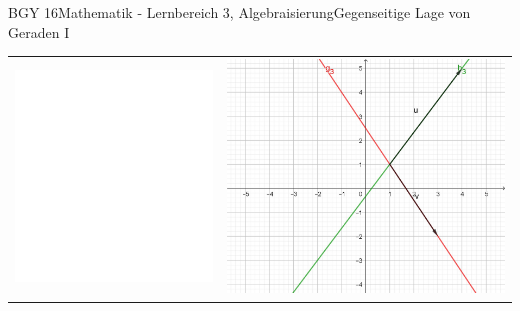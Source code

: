 \documentclass[oneside,openany,headings=optiontotoc,11pt,numbers=noenddot]{scrreprt}
\begin{document}
\begin{worksheet}{BGY 16}{Mathematik - Lernbereich 3, Algebraisierung}{Gegenseitige Lage von Geraden I}
\begin{framed}
\begin{center}
\begin{tabularx}{\textwidth}{Xr}
					\includegraphics[scale=0.29]{../empty.jpg} &
					\includegraphics[scale=0.29]{Bilder/ghSchnitt.jpg}
				\end{tabularx}
			\end{center}
		\end{framed}
	\end{worksheet}
\end{document}
